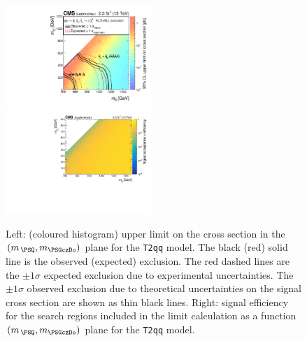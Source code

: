 \clearpage
\begin{figure}[!h]
  \begin{center}
    \includegraphics[width=0.49\textwidth]{Supplementary/RA1T2qqXSEC_aux} \, 
    \includegraphics[width=0.49\textwidth]{Supplementary/T2qq_merging_4_cats_aux} \,     
  \end{center}
  \caption{Left: (coloured histogram) upper limit on the cross section in the $(m_{\,\PSQ}, m_{\PSGczDo})$ plane for the \texttt{T2qq} model. 
  The black (red) solid line is the observed (expected) exclusion. The red dashed lines are the $\pm1\sigma$ expected exclusion due to experimental uncertainties. 
  The $\pm1\sigma$ observed exclusion due to theoretical uncertainties on the signal cross section are shown as thin black lines. 
  Right: signal efficiency for the search regions included in the limit calculation as a function $(m_{\,\PSQ}, m_{\PSGczDo})$ plane for the \texttt{T2qq} model. 
  \label{fig:T2qq_excl}}
\end{figure}


